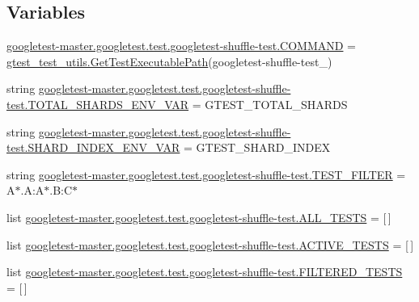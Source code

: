 \subsection*{Variables}
\begin{DoxyCompactItemize}
\item 
\mbox{\hyperlink{namespacegoogletest-master_1_1googletest_1_1test_1_1googletest-shuffle-test_ae8aceb7552b62c5cf38b0bec0c02a6b5}{googletest-\/master.\+googletest.\+test.\+googletest-\/shuffle-\/test.\+C\+O\+M\+M\+A\+ND}} = \mbox{\hyperlink{namespacegtest__test__utils_a89ed3717984a80ffbb7a9c92f71b86a2}{gtest\+\_\+test\+\_\+utils.\+Get\+Test\+Executable\+Path}}(\textquotesingle{}googletest-\/shuffle-\/test\+\_\+\textquotesingle{})
\item 
string \mbox{\hyperlink{namespacegoogletest-master_1_1googletest_1_1test_1_1googletest-shuffle-test_ad83cf3cb8250955d684742d12f7d86cb}{googletest-\/master.\+googletest.\+test.\+googletest-\/shuffle-\/test.\+T\+O\+T\+A\+L\+\_\+\+S\+H\+A\+R\+D\+S\+\_\+\+E\+N\+V\+\_\+\+V\+AR}} = \textquotesingle{}G\+T\+E\+S\+T\+\_\+\+T\+O\+T\+A\+L\+\_\+\+S\+H\+A\+R\+DS\textquotesingle{}
\item 
string \mbox{\hyperlink{namespacegoogletest-master_1_1googletest_1_1test_1_1googletest-shuffle-test_abcc9f5bd42a392fed72cd2d5b4191623}{googletest-\/master.\+googletest.\+test.\+googletest-\/shuffle-\/test.\+S\+H\+A\+R\+D\+\_\+\+I\+N\+D\+E\+X\+\_\+\+E\+N\+V\+\_\+\+V\+AR}} = \textquotesingle{}G\+T\+E\+S\+T\+\_\+\+S\+H\+A\+R\+D\+\_\+\+I\+N\+D\+EX\textquotesingle{}
\item 
string \mbox{\hyperlink{namespacegoogletest-master_1_1googletest_1_1test_1_1googletest-shuffle-test_afe59ae5e430b9800ca98385fe69a9ce9}{googletest-\/master.\+googletest.\+test.\+googletest-\/shuffle-\/test.\+T\+E\+S\+T\+\_\+\+F\+I\+L\+T\+ER}} = \textquotesingle{}A$\ast$.A\+:A$\ast$.B\+:C$\ast$\textquotesingle{}
\item 
list \mbox{\hyperlink{namespacegoogletest-master_1_1googletest_1_1test_1_1googletest-shuffle-test_ad65486430cc546fc7fb8029a7c89126a}{googletest-\/master.\+googletest.\+test.\+googletest-\/shuffle-\/test.\+A\+L\+L\+\_\+\+T\+E\+S\+TS}} = \mbox{[}$\,$\mbox{]}
\item 
list \mbox{\hyperlink{namespacegoogletest-master_1_1googletest_1_1test_1_1googletest-shuffle-test_ae831f2d24d534c560185e2bf658499aa}{googletest-\/master.\+googletest.\+test.\+googletest-\/shuffle-\/test.\+A\+C\+T\+I\+V\+E\+\_\+\+T\+E\+S\+TS}} = \mbox{[}$\,$\mbox{]}
\item 
list \mbox{\hyperlink{namespacegoogletest-master_1_1googletest_1_1test_1_1googletest-shuffle-test_a9973a698aee046315141bb4663421e57}{googletest-\/master.\+googletest.\+test.\+googletest-\/shuffle-\/test.\+F\+I\+L\+T\+E\+R\+E\+D\+\_\+\+T\+E\+S\+TS}} = \mbox{[}$\,$\mbox{]}

\end{DoxyCompactItemize}
